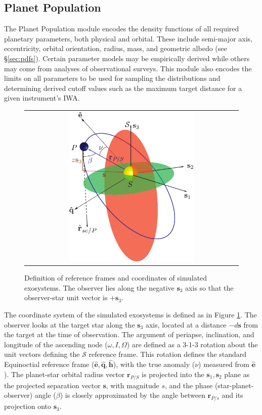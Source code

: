\documentclass[cleanfoot]{asme2ej}
\def\mf{\mathbf}
\newcommand{\mfhat}[1]{\mf{\hat{#1}}}
\newcommand{\reffig}[1]{Figure \ref{#1}}
\begin{document}
\subsection{Planet Population}
The Planet Population module encodes the density functions of all required planetary parameters, both physical and orbital. These include semi-major axis, eccentricity, orbital orientation, radius, mass, and geometric albedo (see \S\ref{sec:pdfs}). Certain parameter models may be empirically derived while others may come from analyses of observational surveys.  This module also encodes the limits on all parameters to be used for sampling the distributions and determining derived cutoff values such as the maximum target distance for a given instrument's IWA.

\begin{figure}[ht]
    \begin{center}
        \begin{tabular}{c}
             \includegraphics[width=0.6\textwidth]{orbit_diagram}
        \end{tabular}
    \end{center}
    \caption{\label{fig:orbit_diagram} Definition of reference frames and coordinates of simulated exosystems.  The observer lies along the negative $\mf s_3$ axis so that the observer-star unit vector is $+\mf s_3$.}
\end{figure}

The coordinate system of the simulated exosystems is defined as in \reffig{fig:orbit_diagram}.  The observer looks at the target star along the $\mathbf{s}_3$ axis, located at a distance $-d\mathbf{s}$ from the target at the time of observation. The argument of periapse, inclination,  and longitude of the ascending node ($\omega, I, \Omega$) are defined as a 3-1-3 rotation about the unit vectors defining the $\mathcal{S}$ reference frame.  This rotation defines the standard Equinoctial reference frame ($\mfhat{e}, \mfhat{q}, \mfhat{h}$), with the true anomaly ($\nu$) measured from $\mfhat{e}$).  The planet-star orbital radius vector $\mf r_{P/S}$ is projected into the $\mf s_1, \mf s_2$ plane as the projected separation vector $\mf s$, with magnitude $s$, and the phase (star-planet-observer) angle ($\beta$) is closely approximated by the angle between $\mf r_{P/s}$ and its projection onto $\mf s_3$.
\end{document}

